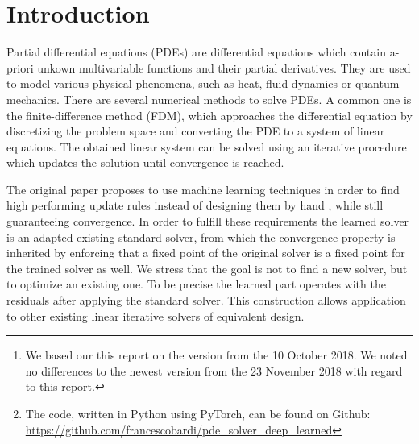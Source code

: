 \documentclass{rescience} %
\begin{document}

\begin{abstract}
This paper is part of the ICLR Reproducibility Challenge 2019. We tried to replicate the results and algorithm for training an iterative partial differential equation solver by interpreting the solver as a linear convolutional neural network and optimizing the weights of the convolutional kernels. We can replicate the results of the original paper \cite{original_paper}\footnote{We based our this report on the version from the 10 October 2018. We noted no differences to the newest version from the 23 November 2018 with regard to this report.}, obtaining a general solver, which generalizes well to a wide variety of geometries and boundary conditions, while achieving high speed ups compared to the baseline solver and guaranteeing convergence.\footnote{The code, written in Python using PyTorch, can be found on Github: \url{https://github.com/francescobardi/pde_solver_deep_learned}}
\end{abstract}



\section{Introduction}

Partial differential equations (PDEs) are differential equations which contain a-priori unkown multivariable functions and their partial derivatives. They are used to model various physical phenomena, such as heat, fluid dynamics or quantum mechanics. There are several numerical methods to solve PDEs. A common one is the finite-difference method (FDM), which approaches the differential equation by discretizing the problem space and converting the PDE to a system of linear equations. The obtained linear system can be solved using an iterative procedure which updates the solution until convergence is reached.

The original paper proposes to use machine learning techniques in order to find high performing update rules instead of designing them by hand \cite{original_paper}, while still guaranteeing convergence.  
In order to fulfill these requirements the learned solver is an adapted existing standard solver, from which the convergence property is inherited by enforcing that a fixed point of the original solver is a fixed point for the trained solver as well. We stress that the goal is not to find a new solver, but to optimize an existing one. To be precise the learned part operates with the residuals after applying the standard solver. This construction allows application to other existing linear iterative solvers of equivalent design.
\end{document}
